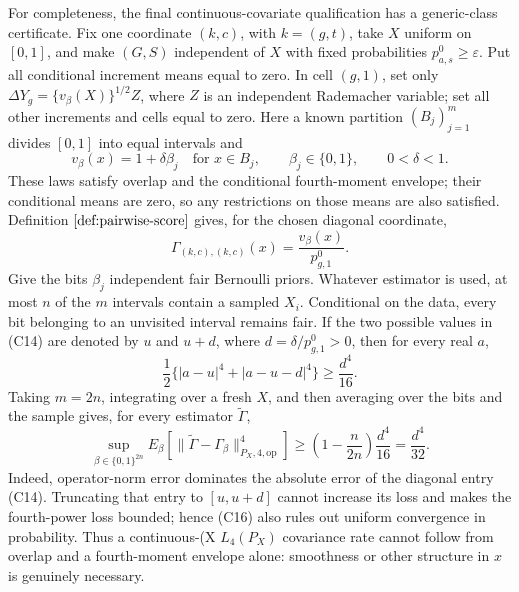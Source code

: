 For completeness, the final continuous-covariate qualification has a generic-class certificate.  Fix one coordinate \((k,c)\), with \(k=(g,t)\), take \(X\) uniform on \([0,1]\), and make \((G,S)\) independent of \(X\) with fixed probabilities \(p^0_{a,s}\ge\varepsilon\).  Put all conditional increment means equal to zero.  In cell \((g,1)\), set only \(\Delta Y_g=\{v_\beta(X)\}^{1/2}Z\), where \(Z\) is an independent Rademacher variable; set all other increments and cells equal to zero.  Here a known partition \((B_j)_{j=1}^{m}\) divides \([0,1]\) into equal intervals and
\[
 v_\beta(x)=1+\delta\beta_j\quad\text{for }x\in B_j,
 \qquad \beta_j\in\{0,1\},\qquad 0<\delta<1.
 \tag{C13}
\]
These laws satisfy overlap and the conditional fourth-moment envelope; their conditional means are zero, so any restrictions on those means are also satisfied.  Definition \(\ref{def:pairwise-score}\) gives, for the chosen diagonal coordinate,
\[
 \Gamma_{(k,c),(k,c)}(x)=\frac{v_\beta(x)}{p^0_{g,1}}.
 \tag{C14}
\]
Give the bits \(\beta_j\) independent fair Bernoulli priors.  Whatever estimator is used, at most \(n\) of the \(m\) intervals contain a sampled \(X_i\).  Conditional on the data, every bit belonging to an unvisited interval remains fair.  If the two possible values in (C14) are denoted by \(u\) and \(u+d\), where \(d=\delta/p^0_{g,1}>0\), then for every real \(a\),
\[
 \frac12\{|a-u|^4+|a-u-d|^4\}\ge\frac{d^4}{16}.
 \tag{C15}
\]
Taking \(m=2n\), integrating over a fresh \(X\), and then averaging over the bits and the sample gives, for every estimator \(\widetilde\Gamma\),
\[
 \sup_{\beta\in\{0,1\}^{2n}}
 E_\beta\!\left[
 \|\widetilde\Gamma-\Gamma_\beta\|_{P_X,4,\mathrm{op}}^4
 \right]
 \ge \left(1-\frac{n}{2n}\right)\frac{d^4}{16}
 =\frac{d^4}{32}.
 \tag{C16}
\]
Indeed, operator-norm error dominates the absolute error of the diagonal entry (C14).  Truncating that entry to \([u,u+d]\) cannot increase its loss and makes the fourth-power loss bounded; hence (C16) also rules out uniform convergence in probability.  Thus a continuous-(X\) \(L_4(P_X)\) covariance rate cannot follow from overlap and a fourth-moment envelope alone: smoothness or other structure in \(x\) is genuinely necessary.

